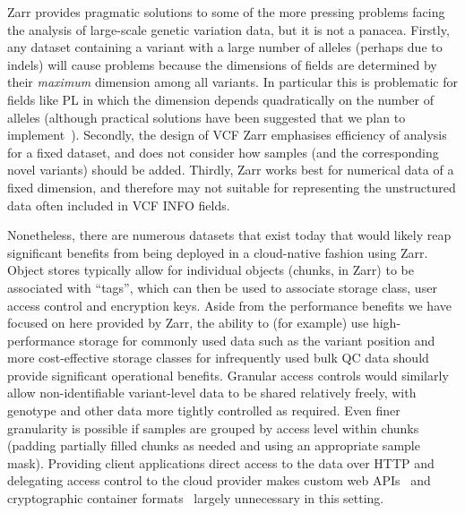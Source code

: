 \documentclass[a4paper,num-refs]{oup-contemporary}
\begin{document}
Zarr provides pragmatic solutions to some of the more pressing
problems facing the analysis of large-scale genetic variation
data, but it is not a panacea. Firstly,
any dataset containing a variant with a large number of alleles
(perhaps due to indels) will cause problems because the
dimensions of fields are determined by their \emph{maximum}
dimension among all variants. In particular this is problematic
for fields like PL in which the dimension depends
quadratically on the number of alleles (although practical
solutions have been suggested that we plan to
implement~\cite{poterba2024scalable}).
Secondly, the design of
VCF Zarr emphasises efficiency of analysis for a fixed
dataset, and does not consider how samples (and the
corresponding novel variants) should be added.
Thirdly, Zarr works best for numerical data of a fixed
dimension, and therefore may not suitable for representing
the unstructured data often included in VCF INFO fields.

Nonetheless, there are numerous datasets that exist today
that would likely reap significant benefits from being deployed
in a cloud-native fashion using Zarr. Object
stores typically allow for individual objects (chunks, in
Zarr) to be associated with ``tags'', which can then be
used to associate storage class, user access control
and encryption keys.
Aside from the performance benefits
we have focused on here provided by Zarr, the ability
to (for example) use high-performance storage for commonly
used data such as the variant position and
more cost-effective storage classes
for infrequently used bulk QC data should provide
significant operational benefits.
Granular access controls would similarly allow non-identifiable
variant-level data to be shared relatively freely,
with genotype and other data more tightly controlled
as required.
Even finer granularity is possible if samples are grouped by
access level within chunks (padding partially filled
chunks as needed and using an appropriate sample mask).
Providing client applications direct access to
the data over HTTP
and delegating access control to the cloud provider
makes custom web APIs~\cite{kelleher2019htsget}
and cryptographic container formats~\citep{senf2021crypt4gh}
largely unnecessary in this setting.
\end{document}
